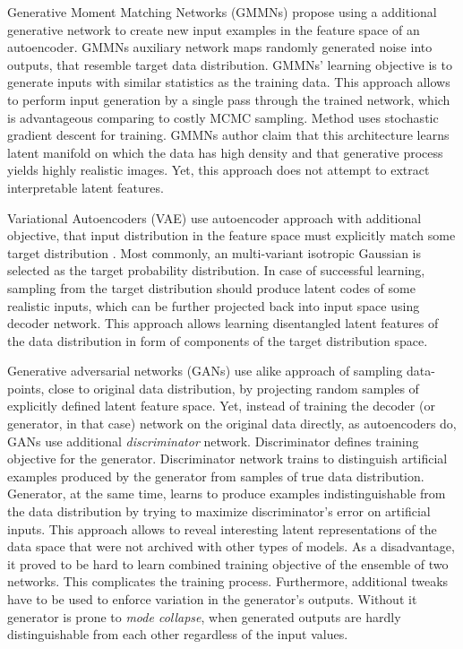 Generative Moment Matching Networks (GMMNs) \cite{Li2015, Ren2016} propose using a additional generative network to create new input examples in the feature space of an autoencoder.
GMMNs auxiliary network maps randomly generated noise into outputs, that resemble target data distribution. GMMNs' learning objective is to generate inputs with similar statistics as the training data.
This approach allows to perform input generation by a single pass through the trained network, which is advantageous comparing to costly MCMC sampling.
Method uses stochastic gradient descent for training. GMMNs author claim that this architecture learns latent manifold on which the data has high density and that generative process yields highly realistic images.
Yet, this approach does not attempt to extract interpretable latent features.

Variational Autoencoders (VAE) use autoencoder approach with additional objective, that input distribution in the feature space must explicitly match some target distribution \cite{Kingma2013, Doersch2016}.
Most commonly, an multi-variant isotropic Gaussian is selected as the target probability distribution.
In case of successful learning, sampling from the target distribution should produce latent codes of some realistic inputs, which can be further projected back into input space using decoder network.
This approach allows learning disentangled latent features of the data distribution in form of components of the target distribution space.

Generative adversarial networks (GANs) \cite{Goodfellow2014} use alike approach of sampling data-points, close to original data distribution, by projecting random samples of explicitly defined latent feature space.
Yet, instead of training the decoder (or generator, in that case) network on the original data directly, as autoencoders do, GANs use additional \textit{discriminator} network. Discriminator defines training objective for the generator. Discriminator network trains to distinguish artificial examples produced by the generator from samples of true data distribution.
Generator, at the same time, learns to produce examples indistinguishable from the data distribution by trying to maximize discriminator's error on artificial inputs.
This approach allows to reveal interesting latent representations of the data space that were not archived with other types of models.
As a disadvantage, it proved to be hard to learn combined training objective of the ensemble of two networks.
This complicates the training process.
Furthermore, additional tweaks have to be used to enforce variation in the generator's outputs.
Without it generator is prone to \textit{mode collapse}, when generated outputs are hardly distinguishable from each other regardless of the input values.

